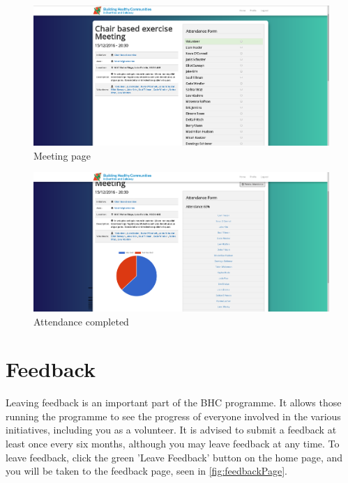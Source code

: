\documentclass{bhcguides}
\begin{document}
\begin{figure}[h]
 \centerline{\includegraphics[width=\textwidth, height=\textheight, keepaspectratio]{meetingpage.png}}
 \caption{Meeting page}
 \label{fig:meetingPage}
\end{figure}

\begin{figure}[h]
 \centerline{\includegraphics[width=\textwidth, height=\textheight, keepaspectratio]{meetingattendance.png}}
 \caption{Attendance completed}
 \label{fig:meetingAttend}
\end{figure}

\pagebreak

\section{Feedback}
\label{sec:feedback}

Leaving feedback is an important part of the BHC programme. It allows those running the programme to see the progress of everyone involved in the various initiatives, including you as a volunteer. It is advised to submit a feedback at least once every six months, although you may leave feedback at any time. To leave feedback, click the green 'Leave Feedback' button on the home page, and you will be taken to the feedback page, seen in \autoref{fig:feedbackPage}.
\end{document}
